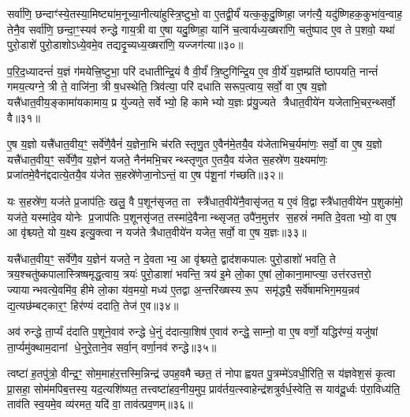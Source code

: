 {\anuvakamend[{अ॒स्मै॒ धा॒व॒ति॒ ता वा एक॑विशतिश्च॥10॥}]}

सर्वा॑णि॒ छन्दाꣳ॑स्ये॒तस्या॒मिष्ट्या॑म॒नूच्या॒नीत्या॑हुस्त्रि॒ष्टुभो॒ वा ए॒तद्वी॒र्यं॑ यत्क॒कुदु॒ष्णिहा॒ जग॑त्यै॒ यदु॑ष्णिहक॒कुभा॑व॒न्वाह॒ तेनै॒व सर्वा॑णि॒ छन्दा॒ꣳ॒स्यव॑ रुन्द्धे गाय॒त्री वा ए॒षा यदु॒ष्णिहा॒ यानि॑ च॒त्वार्यध्य॒ख्षरा॑णि॒ चतु॑ष्पाद ए॒व ते प॒शवो॒ यथा॑ पुरो॒डाशे॑ पुरो॒डाशोऽध्ये॒वमे॒व तद्यदृ॒च्यध्य॒ख्षरा॑णि॒ यज्जग॑त्या॥३०॥

प॒रि॒द॒ध्यादन्तं॑ य॒ज्ञं ग॑मयेत्त्रि॒ष्टुभा॒ परि॑ दधातीन्द्रि॒यं वै वी॒र्यं॑ त्रि॒ष्टुगि॑न्द्रि॒य ए॒व वी॒र्ये॑ य॒ज्ञम्प्रति॑ ष्ठापयति॒ नान्तं॑ गमय॒त्यग्ने॒ त्री ते॒ वाजि॑ना॒ त्री ष॒धस्थेति॒ त्रिव॑त्या॒ परि॑ दधाति सरूप॒त्वाय॒ सर्वो॒ वा ए॒ष य॒ज्ञो यत्त्रै॑धात॒वीय॒ङ्कामा॑यकामाय॒ प्र यु॑ज्यते॒ सर्वेभ्यो॒ हि कामेभ्यो य॒ज्ञः प्र॑यु॒ज्यते त्रैधात॒वीये॑न यजेताभि॒चर॒न्थ्सर्वो॒ वै॥३१॥

ए॒ष य॒ज्ञो यत्त्रै॑धात॒वीय॒ꣳ॒ सर्वे॑णै॒वैनं॑ य॒ज्ञेना॒भि च॑रति स्तृणु॒त ए॒वैन॑मे॒तयै॒व य॑जेताभिच॒र्यमा॑णः॒ सर्वो॒ वा ए॒ष य॒ज्ञो यत्त्रै॑धात॒वीय॒ꣳ॒ सर्वे॑णै॒व य॒ज्ञेन॑ यजते॒ नैन॑मभि॒चरन्थ्स्तृणुत ए॒तयै॒व य॑जेत स॒हस्रे॑ण य॒क्ष्यमा॑णः॒ प्रजा॑तमे॒वैन॑द्ददात्ये॒तयै॒व य॑जेत स॒हस्रे॑णेजा॒नोऽन्तं॒ वा ए॒ष प॑शू॒नां ग॑च्छति॥३२॥

यः स॒हस्रे॑ण॒ यज॑ते प्र॒जाप॑तिः॒ खलु॒ वै प॒शून॑सृजत॒ ता स्त्रै॑धात॒वीये॑नै॒वासृ॑जत॒ य ए॒वं वि॒द्वास्त्रै॑धात॒वीये॑न प॒शुका॑मो॒ यज॑ते॒ यस्मा॑दे॒व योनेः प्र॒जाप॑तिः प॒शूनसृ॑जत॒ तस्मा॑दे॒वैनान्थ्सृजत॒ उपै॑न॒मुत्त॑र स॒हस्रं॑ नमति दे॒वताभ्यो॒ वा ए॒ष आ वृ॑श्च्यते॒ यो य॒क्ष्य इत्यु॒क्त्वा न यज॑ते त्रैधात॒वीये॑न यजेत॒ सर्वो॒ वा ए॒ष य॒ज्ञः॥३३॥

यत्त्रै॑धात॒वीय॒ꣳ॒ सर्वे॑णै॒व य॒ज्ञेन॑ यजते॒ न दे॒वताभ्य॒ आ वृ॑श्च्यते॒ द्वाद॑शकपालः पुरो॒डाशो॑ भवति॒ ते त्रय॒श्चतु॑ष्कपालास्त्रिष्षमृद्ध॒त्वाय॒ त्रयः॑ पुरो॒डाशा॑ भवन्ति॒ त्रय॑ इ॒मे लो॒का ए॒षां लो॒काना॒माप्त्या॒ उत्त॑रउत्तरो॒ ज्यायान्भवत्ये॒वमि॑व॒ हीमे लो॒का य॑व॒मयो॒ मध्य॑ ए॒तद्वा अ॒न्तरि॑ख्षस्य रू॒प समृ॑द्ध्यै॒ सर्वे॑षामभिग॒मय॒न्नव॑ द्य॒त्यछ॑म्बट्कार॒ꣳ॒ हिर॑ण्यं ददाति॒ तेज॑ ए॒व॥३४॥

अव॑ रुन्द्धे ता॒र्प्यं द॑दाति प॒शूने॒वाव॑ रुन्द्धे धे॒नुं द॑दात्या॒शिष॑ ए॒वाव॑ रुन्द्धे॒ साम्नो॒ वा ए॒ष वर्णो॒ यद्धिर॑ण्यं॒ यजु॑षां ता॒र्प्यमु॑क्थाम॒दानां धे॒नुरे॒ताने॒व सर्वा॒न् वर्णा॒नव॑ रुन्द्धे॥३५॥

{\anuvakamend[{जग॑त्याऽभि॒चर॒न्थ्सर्वो॒ वै ग॑च्छति य॒ज्ञस्तेज॑ ए॒व त्रि॒ꣳ॒शच्च॑॥11॥}]}

त्वष्टा॑ ह॒तपु॑त्रो॒ वीन्द्र॒ꣳ॒ सोम॒माह॑र॒त्तस्मि॒न्निन्द्र॑ उपह॒वमैच्छत॒ तं नोपाह्वयत पु॒त्रम्मे॑ऽवधी॒रिति॒ स य॑ज्ञवेश॒सं कृ॒त्वा प्रा॒सहा॒ सोम॑मपिब॒त्तस्य॒ यद॒त्यशि॑ष्यत॒ तत्त्वष्टा॑हव॒नीय॒मुप॒ प्राव॑र्तय॒त्स्वाहेन्द्र॑शत्रुर्वर्ध॒स्वेति॒ स याव॑दू॒र्ध्वः प॑रा॒विध्य॑ति॒ ताव॑ति स्व॒यमे॒व व्य॑रमत॒ यदि॑ वा॒ ताव॑त्प्रव॒णम्॥३६॥

